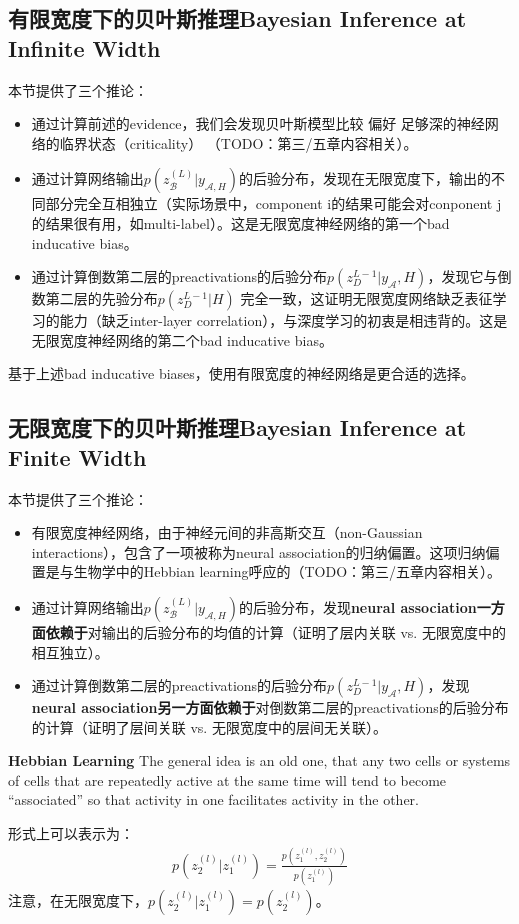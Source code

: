 \subsection{有限宽度下的贝叶斯推理Bayesian Inference at Infinite Width}
本节提供了三个推论：
\begin{itemize}
    \item 通过计算前述的evidence，我们会发现贝叶斯模型比较 偏好 足够深的神经网络的临界状态（criticality） （TODO：第三/五章内容相关）。
    \item 通过计算网络输出$p(z_{\mathcal{B}}^{(L)}|y_{\mathcal{A},H})$的后验分布，发现在无限宽度下，输出的不同部分完全互相独立（实际场景中，component i的结果可能会对conponent j的结果很有用，如multi-label）。这是无限宽度神经网络的第一个bad inducative bias。
    \item 通过计算倒数第二层的preactivations的后验分布$p(z_{D}^{L-1}|y_{\mathcal{A}},H)$，发现它与倒数第二层的先验分布$p(z_{D}^{L-1}|H)$ 完全一致，这证明无限宽度网络缺乏表征学习的能力（缺乏inter-layer correlation），与深度学习的初衷是相违背的。这是无限宽度神经网络的第二个bad inducative bias。
\end{itemize}

基于上述bad inducative biases，使用有限宽度的神经网络是更合适的选择。


\subsection{无限宽度下的贝叶斯推理Bayesian Inference at Finite Width}
本节提供了三个推论：
\begin{itemize}
    \item 有限宽度神经网络，由于神经元间的非高斯交互（non-Gaussian interactions），包含了一项被称为neural association的归纳偏置。这项归纳偏置是与生物学中的Hebbian learning呼应的（TODO：第三/五章内容相关）。
    \item 通过计算网络输出$p(z_{\mathcal{B}}^{(L)}|y_{\mathcal{A},H})$的后验分布，发现\textbf{neural association一方面依赖于}对输出的后验分布的均值的计算（证明了层内关联 vs. 无限宽度中的相互独立）。
    \item 通过计算倒数第二层的preactivations的后验分布$p(z_{D}^{L-1}|y_{\mathcal{A}},H)$，发现\textbf{neural association另一方面依赖于}对倒数第二层的preactivations的后验分布的计算（证明了层间关联 vs. 无限宽度中的层间无关联）。
\end{itemize}


\textbf{Hebbian Learning} The general idea is an old one, that any two cells or systems of cells that are repeatedly active at the same time will tend to become ``associated'' so that activity in one facilitates activity in the other.

形式上可以表示为：
\begin{equation}
    \begin{split}
        p\left(z_2^{(l)}|z_1^{(l)}\right) = \frac{p\left(z
        _1^{(l)}, z_2^{(l)}\right)}{p\left(z
        _1^{(l)}\right)}
    \end{split}
\end{equation}
注意，在无限宽度下，$p\left(z_2^{(l)}|z_1^{(l)}\right)=p\left(z_2^{(l)}\right)$。